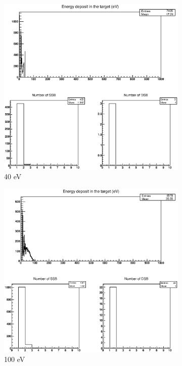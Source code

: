 \begin{figure}
\centering
\begin{subfigure}{.5\textwidth}
  \centering
  \includegraphics[width=.78\linewidth]{./Figures/1fzxe40ev.eps}
  \caption{40 eV}
  \label{fig:sube1}
\end{subfigure}%
\begin{subfigure}{.5\textwidth}
  \centering
  \includegraphics[width=.78\linewidth]{./Figures/1fzxe100ev.eps}
  \caption{100 eV}
  \label{fig:sube2}
\end{subfigure}
\begin{subfigure}{.5\textwidth}
  \centering

\end{subfigure}
\end{figure}
